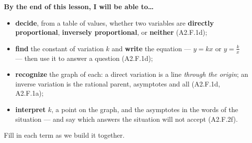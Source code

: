 \documentclass[10pt]{article}
\begin{document}
\namedateperiod

\vspace{0.08in}

\begin{objectivebox}
\textbf{By the end of this lesson, I will be able to\dots}
\begin{itemize}\setlength{\itemsep}{2pt}
  \item \textbf{decide}, from a table of values, whether two variables are \textbf{directly
        proportional}, \textbf{inversely proportional}, or \textbf{neither} (A2.F.1d);
  \item \textbf{find} the constant of variation $k$ and \textbf{write} the equation --- $y=kx$ or
        $y=\frac{k}{x}$ --- then use it to answer a question (A2.F.1d);
  \item \textbf{recognize} the graph of each: a direct variation is a line \emph{through the origin};
        an inverse variation is the rational parent, asymptotes and all (A2.F.1d, A2.F.1a);
  \item \textbf{interpret} $k$, a point on the graph, and the asymptotes in the words of the
        situation --- and say which answers the situation will not accept (A2.F.2f).
\end{itemize}
\end{objectivebox}

\vspace{0.05in}

\begin{vocabbox}
\small
Fill in each term as we build it together.
\par\vspace{2pt}   %
\end{vocabbox}
\end{document}
